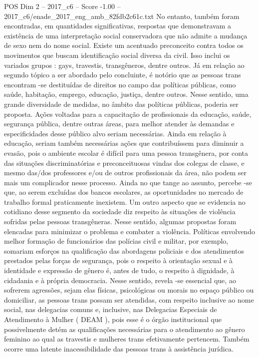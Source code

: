 \begin{textsample}{POS Dim 2 – 2017\_c6 – Score -1.00 – 2017\_c6/enade\_2017\_eng\_amb\_82fdb2c61c.txt}
No entanto, também foram encontradas, em quantidades significativas, respostas que demonstravam a existência de uma interpretação social conservadora que não admite a mudança de sexo nem do nome social.
Existe um acentuado preconceito contra todos os movimentos que buscam identificação social diversa da civil.
Isso inclui os variados grupos : gays, travestis, transgêneros, dentre outros.
Já em relação ao segundo tópico a ser abordado pelo concluinte, é notório que as pessoas trans encontram -se destituídas de direitos no campo das políticas públicas, como saúde, habitação, emprego, educação, justiça, dentre outros.
Nesse sentido, uma grande diversidade de medidas, no âmbito das políticas públicas, poderia ser proposta.
Ações voltadas para a capacitação de profissionais da educação, saúde, segurança pública, dentre outras áreas, para melhor atender às demandas e especificidades desse público alvo seriam necessárias.
Ainda em relação à educação, seriam também necessárias ações que contribuíssem para diminuir a evasão, pois o ambiente escolar é difícil para uma pessoa transgênera, por conta das situações discriminatórias e preconceituosas vindas dos colegas de classe, e mesmo das/dos professores e/ou de outros profissionais da área, não podem ser mais um complicador nesse processo.
Ainda no que tange ao assunto, percebe -se que, ao serem excluídas dos bancos escolares, as oportunidades no mercado de trabalho formal praticamente inexistem.
Um outro aspecto que se evidencia no cotidiano desse segmento da sociedade diz respeito às situações de violência sofridas pelas pessoas transgêneras.
Nesse sentido, algumas propostas foram elencadas para minimizar o problema e combater a violência.
Políticas envolvendo melhor formação de funcionários das polícias civil e militar, por exemplo, somariam esforços na qualificação das abordagens policiais e dos atendimentos prestados pelas forças de segurança, pois o respeito à orientação sexual e à identidade e expressão de gênero é, antes de tudo, o respeito à dignidade, à cidadania e à própria democracia.
Nesse sentido, revela -se essencial que, ao sofrerem agressões, sejam elas físicas, psicológicas ou morais no espaço público ou domiciliar, as pessoas trans possam ser atendidas, com respeito inclusive ao nome social, nas delegacias comuns e, inclusive, nas Delegacias Especiais de Atendimento à Mulher ( DEAM ), pois esse é o órgão institucional que possivelmente detém as qualificações necessárias para o atendimento ao gênero feminino ao qual as travestis e mulheres trans efetivamente pertencem.
Também ocorre uma latente inacessibilidade das pessoas trans à assistência jurídica.

\end{textsample}
